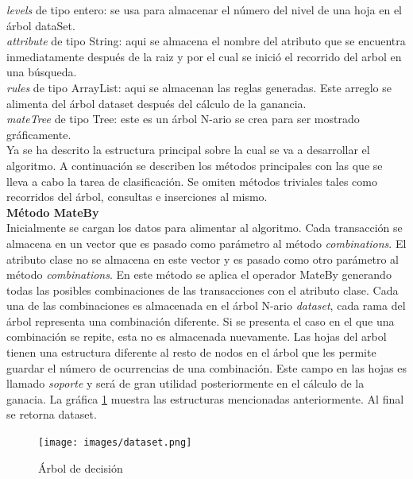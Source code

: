 \textit{levels }de tipo entero: se usa para almacenar el n\'umero del nivel de una hoja en el \'arbol dataSet.\\

\textit{attribute }de tipo String: aqui se almacena el nombre del atributo que se encuentra inmediatamente
despu\'es de la raiz y por el cual se inici\'o el recorrido del arbol en una b\'usqueda.\\

\textit{rules }de tipo ArrayList: aqui se almacenan las reglas generadas. Este arreglo se alimenta del \'arbol
dataset despu\'es del c\'alculo de la ganancia.\\

\textit{mateTree }de tipo Tree: este es un \'arbol N-ario se crea para ser mostrado gr\'aficamente.\\

Ya se ha descrito la estructura principal sobre la cual se va a desarrollar el algoritmo. A continuaci\'on se
describen los m\'etodos principales con las que se lleva a cabo la tarea de clasificaci\'on. Se omiten m\'etodos
triviales tales como recorridos del \'arbol, consultas e inserciones al mismo.\\

\textbf{M\'etodo MateBy}\\
Inicialmente se cargan los datos para alimentar al algoritmo. Cada transacci\'on se almacena en un vector que es
pasado como par\'ametro al m\'etodo \textit{combinations}. El atributo clase no se almacena en este vector y es
pasado como otro par\'ametro al m\'etodo \textit{combinations}. En este m\'etodo se aplica el operador MateBy
generando todas las posibles combinaciones de las transacciones con el atributo clase. Cada una de las
combinaciones es almacenada en el \'arbol N-ario \textit{dataset}, cada rama del \'arbol representa una
combinaci\'on diferente. Si se presenta el caso en el que una combinaci\'on se repite, esta no es almacenada
nuevamente. Las hojas del arbol tienen una estructura diferente al resto de nodos en el \'arbol que les permite
guardar el n\'umero de ocurrencias de una combinaci\'on. Este campo en las hojas es llamado \textit{soporte} y
ser\'a de gran utilidad posteriormente en el c\'alculo de la ganacia. La gr\'afica \ref{f1} muestra las
estructuras mencionadas anteriormente. Al final se retorna dataset.\\

\begin{figure}[t]
\centering
\texttt{[image: images/dataset.png]}
\caption{\'Arbol de decisi\'on}
\label{f1}
\end{figure}

